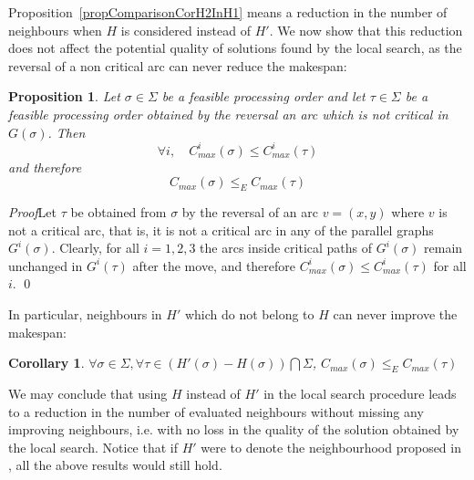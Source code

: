 \documentclass[letterpaper]{article}
\newtheorem{proposition}{Proposition}
\newtheorem{corollary}{Corollary}
\begin{document}
Proposition~\ref{propComparisonCorH2InH1} means a reduction in the number of neighbours when $H$ is considered instead of $H'$. We now show that this reduction does not affect the potential quality of solutions found by the local search, as the reversal of a non critical arc can never reduce the makespan:
\begin{proposition}\label{propOutsideH2WorseCmax}
Let $\sigma \in \Sigma$ be a feasible processing order and let $\tau \in \Sigma$ be a feasible processing order obtained by the reversal an arc which is not critical in $G(\sigma)$. Then%
\begin{equation}
\forall i, \quad C_{max}^i(\sigma) \leq C_{max}^i(\tau)
\end{equation}
and therefore
\begin{equation}
C_{max}(\sigma) \leq_E C_{max}(\tau)
\end{equation}
\end{proposition}
\emph{Proof}Let $\tau$ be obtained from $\sigma$ by the reversal of an arc $v=(x,y)$ where $v$ is not a critical arc, that is, it is not a critical arc in any of the parallel graphs $G^i(\sigma)$. Clearly, for all $i=1,2,3$ the arcs inside critical paths of $G^i(\sigma)$ remain unchanged in $G^i(\tau)$ after the move, and therefore $C_{max}^i(\sigma) \leq C_{max}^i(\tau)$ for all $i$. \qed

In particular, neighbours in $H'$ which do not belong to $H$ can never improve the makespan:
\begin{corollary}\label{propH2-H1WorseCmax}
$\forall \sigma \in \Sigma, \forall \tau \in \left( H'(\sigma) - H(\sigma) \right) \bigcap \Sigma$, $C_{max}(\sigma) \leq_E C_{max}(\tau)$
\end{corollary}

We may conclude that using $H$ instead of $H'$ in the local search procedure leads to a reduction in the number of evaluated neighbours without missing any improving neighbours, i.e. with no loss in the quality of the solution obtained by the local search. Notice that if $H'$ were to denote the neighbourhood proposed in \cite{Fortemps1997}, all the above results would still hold.
\end{document}

